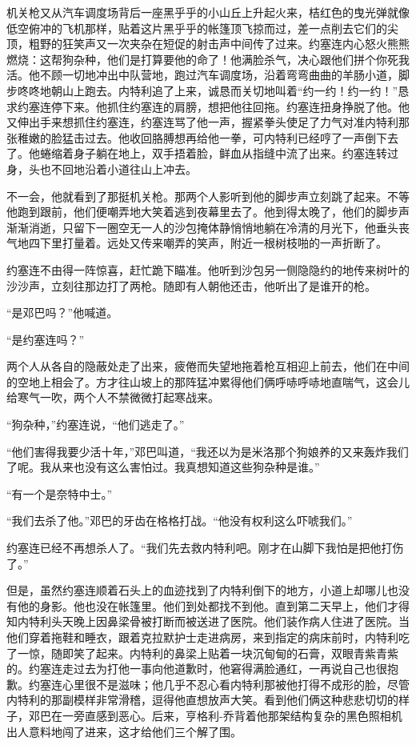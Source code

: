  


    机关枪又从汽车调度场背后一座黑乎乎的小山丘上升起火来，桔红色的曳光弹就像低空俯冲的飞机那样，贴着这片黑乎乎的帐篷顶飞掠而过，差一点削去它们的尖顶，粗野的狂笑声又一次夹杂在短促的射击声中间传了过来。约塞连内心怒火熊熊燃烧：这帮狗杂种，他们是打算要他的命了！他满脸杀气，决心跟他们拼个你死我活。他不顾一切地冲出中队营地，跑过汽车调度场，沿着弯弯曲曲的羊肠小道，脚步咚咚地朝山上跑去。内特利追了上来，诚恳而关切地叫着“约一约！约一约！”恳求约塞连停下来。他抓住约塞连的肩膀，想把他往回拖。约塞连扭身挣脱了他。他又伸出手来想抓住约塞连，约塞连骂了他一声，握紧拳头使足了力气对准内特利那张稚嫩的脸猛击过去。他收回胳膊想再给他一拳，可内特利已经哼了一声倒下去了。他蜷缩着身子躺在地上，双手捂着脸，鲜血从指缝中流了出来。约塞连转过身，头也不回地沿着小道往山上冲去。

    不一会，他就看到了那挺机关枪。那两个人影听到他的脚步声立刻跳了起来。不等他跑到跟前，他们便嘲弄地大笑着逃到夜幕里去了。他到得太晚了，他们的脚步声渐渐消逝，只留下一圈空无一人的沙包掩体静悄悄地躺在冷清的月光下，他垂头丧气地四下里打量着。远处又传来嘲弄的笑声，附近一根树枝啪的一声折断了。

    约塞连不由得一阵惊喜，赶忙跪下瞄准。他听到沙包另一侧隐隐约的地传来树叶的沙沙声，立刻往那边打了两枪。随即有人朝他还击，他听出了是谁开的枪。

    “是邓巴吗？”他喊道。

    “是约塞连吗？”

    两个人从各自的隐蔽处走了出来，疲倦而失望地拖着枪互相迎上前去，他们在中间的空地上相会了。方才往山坡上的那阵猛冲累得他们俩呼哧呼哧地直喘气，这会儿给寒气一吹，两个人不禁微微打起寒战来。

    “狗杂种，”约塞连说，“他们逃走了。”

    “他们害得我要少活十年，”邓巴叫道，“我还以为是米洛那个狗娘养的又来轰炸我们了呢。我从来也没有这么害怕过。我真想知道这些狗杂种是谁。”

    “有一个是奈特中士。”

    “我们去杀了他。”邓巴的牙齿在格格打战。“他没有权利这么吓唬我们。”

    约塞连已经不再想杀人了。“我们先去救内特利吧。刚才在山脚下我怕是把他打伤了。”

    但是，虽然约塞连顺着石头上的血迹找到了内特利倒下的地方，小道上却哪儿也没有他的身影。他也没在帐篷里。他们到处都找不到他。直到第二天早上，他们才得知内特利头天晚上因鼻梁骨被打断而被送进了医院。他们装作病人住进了医院。当他们穿着拖鞋和睡衣，跟着克拉默护士走进病房，来到指定的病床前时，内特利吃了一惊，随即笑了起来。内特利的鼻梁上贴着一块沉甸甸的石膏，双眼青紫青紫的。约塞连走过去为打他一事向他道歉时，他窘得满脸通红，一再说自己也很抱歉。约塞连心里很不是滋味；他几乎不忍心看内特利那被他打得不成形的脸，尽管内特利的那副模样非常滑稽，逗得他直想放声大笑。看到他们俩这种悲悲切切的样子，邓巴在一旁直感到恶心。后来，亨格利-乔背着他那架结构复杂的黑色照相机出人意料地闯了进来，这才给他们三个解了围。


